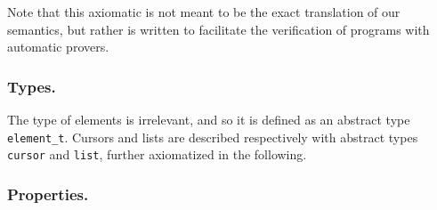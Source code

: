 \documentclass[runningheads,a4paper]{llncs}
\begin{document}
Note that this axiomatic is not meant to be the exact translation of our
semantics, but rather is written to facilitate the verification of programs
with automatic provers.

\subsubsection{Types.}

The type of elements is irrelevant, and so it is defined as an abstract
type \verb|element_t|. Cursors and lists are described respectively with abstract types 
\verb|cursor| and \verb|list|, further axiomatized in the following.

\subsubsection{Properties.}
\end{document}
